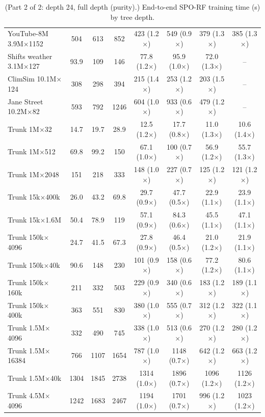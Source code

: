 \begin{table}[p]
\begin{tabular}{l|ccc|cccc}
        YouTube-8M 3.9M$\times$1152 & 504 & 613 & 852 & 423 (1.2$\times$) & 549 (0.9$\times$) & 379 (1.3$\times$) & 385 (1.3$\times$) \\
        Shifts weather 3.1M$\times$127 & 93.9 & 109 & 146 & 77.8 (1.2$\times$) & 95.9 (1.0$\times$) & 72.0 (1.3$\times$) & -- \\
        ClimSim 10.1M$\times$124 & 308 & 298 & 394 & 215 (1.4$\times$) & 253 (1.2$\times$) & 203 (1.5$\times$) & -- \\
        Jane Street 10.2M$\times$82 & 593 & 792 & 1246 & 604 (1.0$\times$) & 933 (0.6$\times$) & 479 (1.2$\times$) & -- \\
        Trunk 1M$\times$32 & 14.7 & 19.7 & 28.9 & 12.5 (1.2$\times$) & 17.7 (0.8$\times$) & 11.0 (1.3$\times$) & 10.6 (1.4$\times$) \\
        Trunk 1M$\times$512 & 69.8 & 99.2 & 150 & 67.1 (1.0$\times$) & 100 (0.7$\times$) & 56.9 (1.2$\times$) & 55.7 (1.3$\times$) \\
        Trunk 1M$\times$2048 & 151 & 218 & 333 & 148 (1.0$\times$) & 227 (0.7$\times$) & 125 (1.2$\times$) & 121 (1.2$\times$) \\
        Trunk 15k$\times$400k & 26.0 & 43.2 & 69.8 & 29.7 (0.9$\times$) & 47.7 (0.5$\times$) & 22.9 (1.1$\times$) & 23.9 (1.1$\times$) \\
        Trunk 15k$\times$1.6M & 50.4 & 78.9 & 119 & 57.1 (0.9$\times$) & 84.3 (0.6$\times$) & 45.5 (1.1$\times$) & 47.1 (1.1$\times$) \\
        Trunk 150k$\times$4096 & 24.7 & 41.5 & 67.3 & 27.8 (0.9$\times$) & 46.4 (0.5$\times$) & 21.0 (1.2$\times$) & 21.9 (1.1$\times$) \\
        Trunk 150k$\times$40k & 90.6 & 148 & 230 & 101 (0.9$\times$) & 158 (0.6$\times$) & 77.2 (1.2$\times$) & 80.6 (1.1$\times$) \\
        Trunk 150k$\times$160k & 211 & 332 & 503 & 229 (0.9$\times$) & 340 (0.6$\times$) & 183 (1.2$\times$) & 189 (1.1$\times$) \\
        Trunk 150k$\times$400k & 363 & 551 & 830 & 380 (1.0$\times$) & 555 (0.7$\times$) & 312 (1.2$\times$) & 322 (1.1$\times$) \\
        Trunk 1.5M$\times$4096 & 332 & 490 & 745 & 338 (1.0$\times$) & 513 (0.6$\times$) & 270 (1.2$\times$) & 280 (1.2$\times$) \\
        Trunk 1.5M$\times$16384 & 766 & 1107 & 1654 & 787 (1.0$\times$) & 1148 (0.7$\times$) & 642 (1.2$\times$) & 663 (1.2$\times$) \\
        Trunk 1.5M$\times$40k & 1304 & 1845 & 2738 & 1314 (1.0$\times$) & 1896 (0.7$\times$) & 1096 (1.2$\times$) & 1126 (1.2$\times$) \\
        Trunk 4.5M$\times$4096 & 1242 & 1683 & 2467 & 1194 (1.0$\times$) & 1701 (0.7$\times$) & 996 (1.2$\times$) & 1023 (1.2$\times$) \\
        \hline
    \end{tabular}
    \caption{(Part 2 of 2: depth 24, full depth (purity).) End-to-end SPO-RF training time (s) by tree depth.}
    \label{tab:overall-p2}
\end{table}
